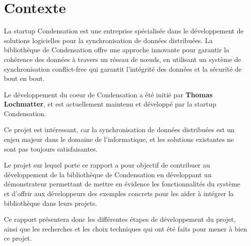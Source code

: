 \section{Contexte}
La startup Condensation est une entreprise spécialisée dans le développement de solutions logicielles pour la synchronisation de données distribuées. La bibliothèque de Condensation offre une approche innovante pour garantir la cohérence des données à travers un réseau de n\oe uds, en utilisant un système de synchronisation conflict-free qui garantit l'intégrité des données et la sécurité de bout en bout.

Le développement du coeur de Condensation a été initié par \textbf{Thomas Lochmatter}, et est actuellement maintenu et développé par la startup Condensation.

Ce projet est intéressant, car la synchronisation de données distribuées est un enjeu majeur dans le domaine de l'informatique, et les solutions existantes ne sont pas toujours satisfaisantes.

Le projet sur lequel porte ce rapport a pour objectif de contribuer au développement de la bibliothèque de Condensation en développant un démonstrateur permettant de mettre en évidence les fonctionnalités du système et d'offrir aux développeurs des exemples concrets pour les aider à intégrer la bibliothèque dans leurs projets.

Ce rapport présentera donc les différentes étapes de développement du projet, ainsi que les recherches et les choix techniques qui ont été faits pour mener à bien ce projet.